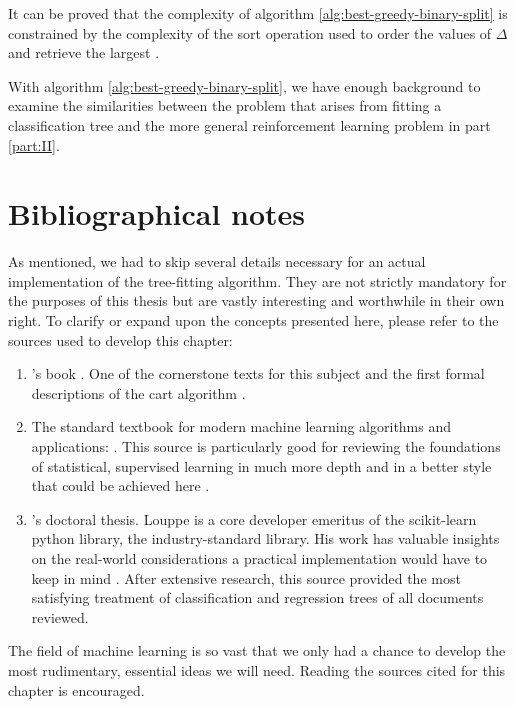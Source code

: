 It can be proved that the complexity of algorithm
\ref{alg:best-greedy-binary-split} is constrained by the complexity of the sort
operation used to order the values of $\Delta$ and retrieve the largest
\cite[Ch.~5]{louppe2014}.

With algorithm \ref{alg:best-greedy-binary-split}, we have enough background to
examine the similarities between the problem that arises from fitting a
classification tree and the more general reinforcement learning problem in part
\ref{part:II}.

\section{Bibliographical notes}
As mentioned, we had to skip several details necessary for an actual
implementation of the tree-fitting algorithm. They are not strictly mandatory
for the purposes of this thesis but are vastly interesting and worthwhile in
their own right. To clarify or expand upon the concepts presented here, please
refer to the sources used to develop this chapter:
\begin{enumerate}
    \item \citeauthor{breiman2017}'s book . One of the
        cornerstone texts for this subject and the first formal descriptions of
        the \ac{cart} algorithm \cite{breiman2017}.
    \item The standard textbook for modern machine learning algorithms and
        applications: . This source is particularly good
        for reviewing the foundations of statistical, supervised learning in
        much more depth and in a better style that could be achieved here
        \cite{elements2009}.
    \item \citeauthor{louppe2014}'s doctoral thesis. Louppe is a core developer
        emeritus of the scikit-learn python library, the industry-standard
        library.  His work has valuable insights on the real-world
        considerations a practical implementation would have to keep in mind
        \cite{louppe2014}. After extensive research, this source provided the
        most satisfying treatment of classification and regression trees of all
        documents reviewed.
\end{enumerate}

The field of machine learning is so vast that we only had a chance to develop
the most rudimentary, essential ideas we will need. Reading the sources cited
for this chapter is encouraged.